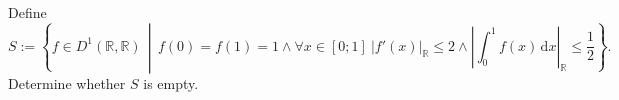 \begin{problem}
    Define
    \[
        S := \left\{ f \in D^1\left(\mathbb{R},\mathbb{R}\right) \,\middle|\, f\left(0\right) = f\left(1\right) = 1 \wedge \forall x \in \left[0;1\right] \ \left|f'\left(x\right)\right|_{\mathbb{R}} \leq 2 \wedge \left|\int_0^1 f\left(x\right) \,\mathrm{d}x\right|_{\mathbb{R}} \leq \frac{1}{2} \right\}.
    \]
    Determine whether \( S \) is empty.
\end{problem}
